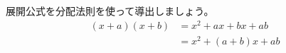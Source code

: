 \documentclass{ltjsarticle}
\begin{document}
展開公式を分配法則を使って導出しましょう。
\begin{align}
(x+a)(x+b) &= x^2 + ax + bx + ab\\
&= x^2 + (a+b)x + ab \label{eq:expand_ab}
\end{align}
\end{document}
